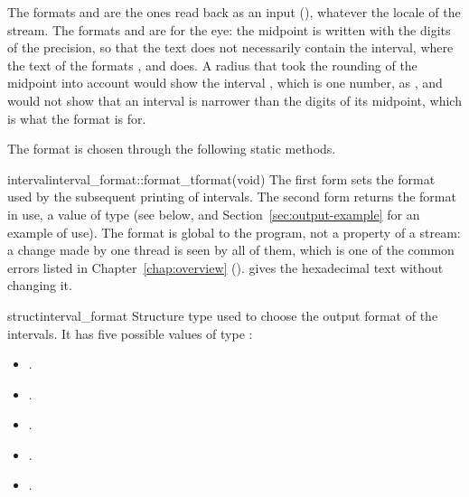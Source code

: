 \documentclass[12pt,a4paper,twoside,openright]{book}
\begin{document}
\begin{Rem}
The formats  and  are the ones read back as
an input (), whatever the locale of the stream. The
formats  and  are for the eye: the midpoint
is written with the digits of the precision, so that the text
 does not necessarily contain the interval, where the text
of the formats ,  and  does.
A radius that took the rounding of the midpoint into account would show the
interval , which is one number, as , and
would not show that an interval is narrower than the digits of its
midpoint, which is what the format is for.
\end{Rem}

\medskip
The format is chosen through the following static methods.

\begin{defstaticmethod}{interval}{interval\_format::format\_t}{format}{(void)}
  The first form sets the format used by the subsequent printing of
  intervals. The second form returns the format in use, a value of type
   (see below, and
  Section~\ref{sec:output-example} for an example of use). The format is
  global to the program, not a property of a stream: a change made by one
  thread is seen by all of them, which is one of the common errors listed
  in Chapter~\ref{chap:overview} ().
   gives the hexadecimal text without changing it.
\end{defstaticmethod}

\begin{deftype}{struct}{interval\_format}
  Structure type used to choose the output format of the intervals. It has
  five possible values of type :
\begin{itemize}
\item {}.
\item {}.
\item {}.
\item {}.
\item {}.
\end{itemize}
\end{deftype}
\end{document}
